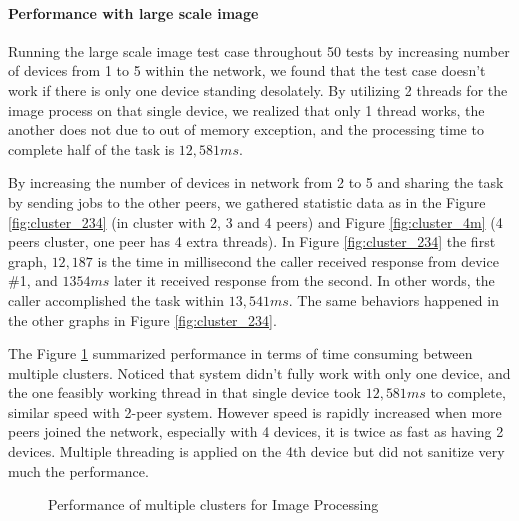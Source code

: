 \documentclass[conference]{IEEEtran}
\begin{document}
\paragraph{Performance with large scale image}

Running the large scale image test case throughout 50 tests by increasing number of devices from 1 to 5 within the network, we found that the test case doesn't work if there is only one device standing desolately. By utilizing 2 threads for the image process on that single device, we realized that only 1 thread works, the another does not due to out of memory exception, and the processing time to complete half of the task is $12,581ms$. 

By increasing the number of devices in network from 2 to 5 and sharing the task by sending jobs to the other peers, we gathered statistic data as in the Figure \ref{fig:cluster_234} (in cluster with 2, 3 and 4 peers) and Figure \ref{fig:cluster_4m} (4 peers cluster, one peer has 4 extra threads). In Figure \ref{fig:cluster_234} the first graph, $12,187$ is the time in millisecond the caller received response from device \#1, and $1354ms$ later it received response from the second. In other words, the caller accomplished the task within $13,541ms$. The same behaviors happened in the other graphs in Figure \ref{fig:cluster_234}.  
 

The Figure \ref{fig:cluster_performance} summarized performance in terms of time consuming between multiple clusters. Noticed that system didn't fully work with only one device, and the one feasibly working thread in that single device took $12,581ms$ to complete, similar speed with 2-peer system. However speed is rapidly increased when more peers joined the network, especially with 4 devices, it is twice as fast as having 2 devices. Multiple threading is applied on the 4th device but did not sanitize very much the performance. 

\begin{figure}[H]
	\hspace*{-0.35cm}
	\caption{Performance of multiple clusters for Image Processing}
	\label{fig:cluster_performance}
\end{figure}
\end{document}
